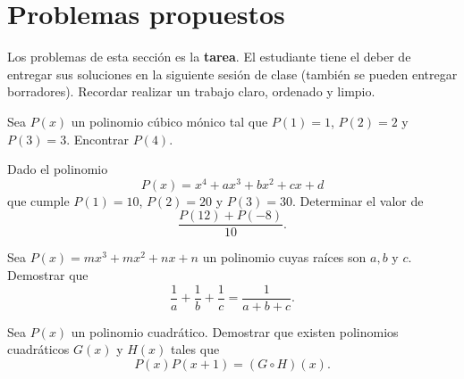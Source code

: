 \section{Problemas propuestos}

Los problemas de esta sección es la \textbf{tarea}.
El estudiante tiene el deber de entregar sus soluciones en la siguiente sesión de clase (también se pueden entregar borradores).
Recordar realizar un trabajo claro, ordenado y limpio.

\begin{multicols}{2}

    \begin{problem}
        Sea $P(x)$ un polinomio cúbico mónico tal que $P(1) = 1$, $P(2) = 2$ y $P(3) = 3$.
        Encontrar $P(4).$
    \end{problem}

    \begin{problem}
        Dado el polinomio
        \[
            P(x) = x^4 + ax^3 + bx^2 + cx + d
        \]
        que cumple $P(1) = 10$, $P(2) = 20$ y $P(3) = 30$.
        Determinar el valor de
        \[
            \frac{P(12) + P(-8)}{10}.
        \]
    \end{problem}

    \begin{problem}
        Sea $P(x) = mx^3 + mx^2 + nx + n$ un polinomio cuyas raíces son $a, b \mbox{ y } c$.
        Demostrar que
        \[\frac{1}{a} + \frac{1}{b} + \frac{1}{c} = \frac{1}{a + b + c}.\]
    \end{problem}

    \begin{problem}
        Sea $P(x)$ un polinomio cuadrático.
        Demostrar que existen polinomios cuadráticos $G(x)$ y $H(x)$ tales que
        \[
            P(x)P(x+1) = (G \circ H)(x).
        \]
    \end{problem}
\end{multicols}